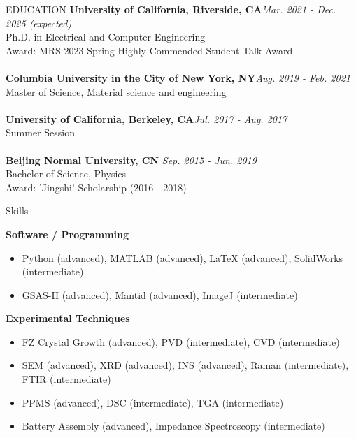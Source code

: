 \documentclass{resume} %
\begin{document}

\begin{rSection}{EDUCATION}
{\bf University of California, Riverside, CA}\hfill{\em Mar. 2021 - Dec. 2025 (expected)}
\\ Ph.D. in Electrical and Computer Engineering
\\ Award: MRS 2023 Spring Highly Commended Student Talk Award
\\
\\{\bf Columbia University in the City of New York, NY}\hfill{\em Aug. 2019 - Feb. 2021} 
\\ Master of Science, Material science and engineering
\\
\\{\bf University of California, Berkeley, CA}\hfill{\em Jul. 2017 - Aug. 2017}
\\ Summer Session
\\
\\{\bf Beijing Normal University, CN} \hfill {\em Sep. 2015 - Jun. 2019} 
\\ Bachelor of Science, Physics
\\ Award: 'Jingshi' Scholarship (2016 - 2018)

\end{rSection}


\begin{rSection}{Skills }

	\textbf{Software / Programming}
\begin{itemize}
    \item Python (advanced), MATLAB (advanced), LaTeX (advanced), SolidWorks (intermediate)
    \item GSAS-II (advanced), Mantid (advanced), ImageJ (intermediate)
\end{itemize}

	\textbf{Experimental Techniques}
\begin{itemize}
    \item FZ Crystal Growth (advanced), PVD (intermediate), CVD (intermediate)
    \item SEM (advanced), XRD (advanced), INS (advanced), Raman (intermediate), FTIR (intermediate)
    \item PPMS (advanced), DSC (intermediate), TGA (intermediate)
    \item Battery Assembly (advanced), Impedance Spectroscopy (intermediate)
\end{itemize}

\end{rSection}
\end{document}
